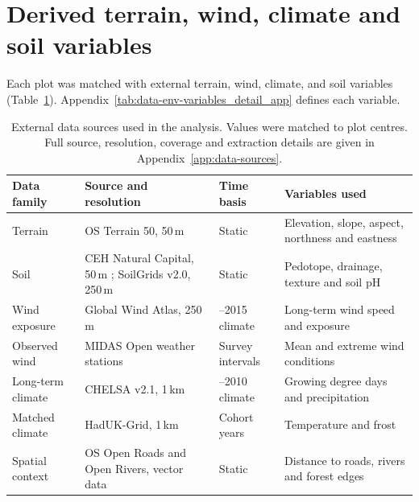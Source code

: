 \documentclass[logo,msc,ai]{infthesis}           %
\begin{document}
\section{Derived terrain, wind, climate and soil variables}
\label{sec:data-environmental}

Each plot was matched with external terrain, wind, climate, and soil variables (Table~\ref{tab:data-env-sources}). Appendix~\ref{tab:data-env-variables_detail_app} defines each variable.

\begin{table}[!htbp]
\centering
\scriptsize
\setlength{\tabcolsep}{4pt}
\renewcommand{\arraystretch}{1.05}

\begin{tabular}{
    >{\raggedright\arraybackslash}p{2.0cm}
    >{\raggedright\arraybackslash}p{4.2cm}
    >{\raggedright\arraybackslash}p{2.3cm}
    >{\raggedright\arraybackslash}p{4.0cm}
}
\hline
Data family & Source and resolution & Time basis & Variables used \\
\hline

Terrain
& OS Terrain 50, 50\,m \cite{ordnancesurveyTerrain50_C3_LID}
& Static
& Elevation, slope, aspect, northness and eastness \\

Soil
& CEH Natural Capital, 50\,m \cite{feeney2026CEHNaturalCapital_C3_LID}; SoilGrids v2.0, 250\,m \cite{poggio2021SoilGrids_C3_LID}
& Static
& Pedotope, drainage, texture and soil pH \\

Wind exposure
& Global Wind Atlas, 250\,m \cite{davis2023GlobalWindAtlas_C3_LID}
& 2006--2015 climate
& Long-term wind speed and exposure \\

Observed wind
& MIDAS Open weather stations \cite{metoffice2019MIDASOpen_C3_LID}
& Survey intervals
& Mean and extreme wind conditions \\

Long-term climate
& CHELSA v2.1, 1\,km \cite{karger2017CHELSA_C3_LID}
& 1981--2010 climate
& Growing degree days and precipitation \\

Matched climate
& HadUK-Grid, 1\,km \cite{hollis2019HadUKGrid_C3_LID}
& Cohort years
& Temperature and frost \\

Spatial context
& OS Open Roads and Open Rivers, vector data
\cite{ordnancesurveyOpenRoads_C3_LID,ordnancesurveyOpenRivers_C3_LID}
& Static
& Distance to roads, rivers and forest edges \\

\hline
\end{tabular}

\caption{\small{External data sources used in the analysis. Values were matched to plot centres. Full source, resolution, coverage and extraction details are given in Appendix~\ref{app:data-sources}.}}
\label{tab:data-env-sources}
\end{table}
\end{document}
